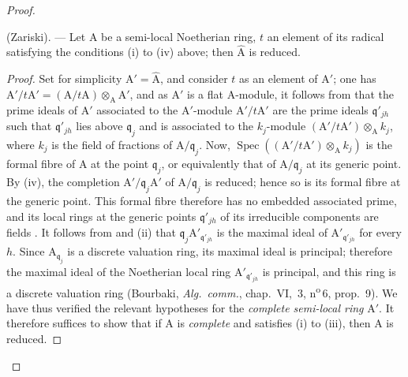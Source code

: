 \begin{proof}
\begin{lemma}[7.6.4.1]
\label{IV.7.6.4.1}
(Zariski). --- Let $\mathrm{A}$ be a semi-local Noetherian ring, $t$ an element of its radical satisfying the conditions \textup{(i)} to \textup{(iv)} above; then $\widehat{\mathrm{A}}$ is reduced.
\end{lemma}

\begin{proof}
\renewcommand{\qedsymbol}{\openbox}
Set for simplicity $\mathrm{A}'=\widehat{\mathrm{A}}$, and consider $t$ as an element of $\mathrm{A}'$; one has $\mathrm{A}'/t\mathrm{A}'=(\mathrm{A}/t\mathrm{A})\otimes_\mathrm{A}\mathrm{A}'$, and as $\mathrm{A}'$ is a flat $\mathrm{A}$-module, it follows from  that the prime ideals of $\mathrm{A}'$ associated to the $\mathrm{A}'$-module $\mathrm{A}'/t\mathrm{A}'$ are the prime ideals $\mathfrak{q}'_{jh}$ such that $\mathfrak{q}'_{jh}$ lies above $\mathfrak{q}_j$ and is associated to the $k_j$-module $(\mathrm{A}'/t\mathrm{A}')\otimes_\mathrm{A} k_j$, where $k_j$ is the field of fractions of $\mathrm{A}/\mathfrak{q}_j$. Now, $\operatorname{Spec}((\mathrm{A}'/t\mathrm{A}')\otimes_\mathrm{A} k_j)$ is the formal fibre of $\mathrm{A}$ at the point $\mathfrak{q}_j$, or equivalently that of $\mathrm{A}/\mathfrak{q}_j$ at its generic point. By (iv), the completion $\mathrm{A}'/\mathfrak{q}_j\mathrm{A}'$ of $\mathrm{A}/\mathfrak{q}_j$ is reduced; hence so is its formal fibre at the generic point. This formal fibre therefore has no embedded associated prime, and its local rings at the generic points $\mathfrak{q}'_{jh}$ of its irreducible components are fields . It follows from  and (ii) that $\mathfrak{q}_j\mathrm{A}'_{\mathfrak{q}'_{jh}}$ is the maximal ideal of $\mathrm{A}'_{\mathfrak{q}'_{jh}}$ for every $h$. Since $\mathrm{A}_{\mathfrak{q}_j}$ is a discrete valuation ring, its maximal ideal is principal; therefore the maximal ideal of the Noetherian local ring $\mathrm{A}'_{\mathfrak{q}'_{jh}}$ is principal, and this ring is a discrete valuation ring (Bourbaki, \emph{Alg.\ comm.}, chap.~VI, \textsection\,3, n\textsuperscript{o}\,6, prop.~9). We have thus verified the relevant hypotheses for the \emph{complete semi-local ring} $\mathrm{A}'$. It therefore suffices to show that if $\mathrm{A}$ is \emph{complete} and satisfies (i) to (iii), then $\mathrm{A}$ is reduced.


\end{proof}
\end{proof}
